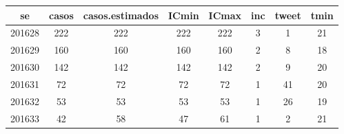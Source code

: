 \begin{tabular}{c|ccccccc}
  \hline
se & casos & casos.estimados & ICmin & ICmax & inc & tweet & tmin \\ 
  \hline
201628 & 222 & 222 & 222 & 222 & 3 & 1 & 21 \\ 
  201629 & 160 & 160 & 160 & 160 & 2 & 8 & 18 \\ 
  201630 & 142 & 142 & 142 & 142 & 2 & 9 & 20 \\ 
  201631 & 72 & 72 & 72 & 72 & 1 & 41 & 20 \\ 
  201632 & 53 & 53 & 53 & 53 & 1 & 26 & 19 \\ 
  201633 & 42 & 58 & 47 & 61 & 1 & 2 & 21 \\ 
   \hline
\end{tabular}
